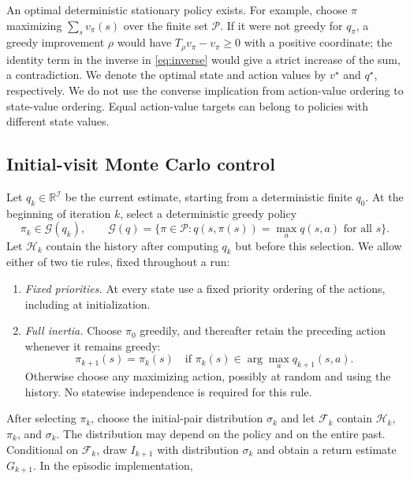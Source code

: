An optimal deterministic stationary policy exists. For example, choose $\pi$ maximizing
$\sum_s v_\pi(s)$ over the finite set $\mathcal P$. If it were not greedy for $q_\pi$, a greedy improvement $\rho$ would
have $T_\rho v_\pi-v_\pi\ge0$ with a positive coordinate; the identity term in the inverse in \eqref{eq:inverse} would
give a strict increase of the sum, a contradiction. We denote the optimal state and action
values by $v^\star$ and $q^\star$, respectively. We do not use the converse implication from action-value
ordering to state-value ordering. Equal action-value targets can belong to policies with
different state values.

\subsection{Initial-visit Monte Carlo control}\label{sec:algorithm}
Let $q_k\in\mathbb R^{\mathcal I}$ be the current estimate, starting from a deterministic finite $q_0$. At the beginning
of iteration $k$, select a deterministic greedy policy
\begin{equation}\label{eq:greedy}
\pi_k\in\mathcal G(q_k),\qquad
\mathcal G(q)=\{\pi\in\mathcal P:q(s,\pi(s))=\max_a q(s,a)\text{ for all }s\}.
\end{equation}
Let $\mathcal H_k$ contain the history after computing $q_k$ but before this selection. We allow either of
two tie rules, fixed throughout a run:
\begin{enumerate}
\item \emph{Fixed priorities.} At every state use a fixed priority ordering of the actions, including at
initialization.
\item \emph{Full inertia.} Choose $\pi_0$ greedily, and thereafter retain the preceding action whenever it
remains greedy:
\begin{equation}\label{eq:inertia}
\pi_{k+1}(s)=\pi_k(s)\quad\text{if }\pi_k(s)\in\arg\max_a q_{k+1}(s,a).
\end{equation}
Otherwise choose any maximizing action, possibly at random and using the history.
No statewise independence is required for this rule.
\end{enumerate}
After selecting $\pi_k$, choose the initial-pair distribution $\sigma_k$ and let $\mathcal F_k$ contain $\mathcal H_k$, $\pi_k$, and $\sigma_k$.
The distribution may depend on the policy and on the entire past. Conditional on $\mathcal F_k$, draw
$I_{k+1}$ with distribution $\sigma_k$ and obtain a return estimate $G_{k+1}$. In the episodic implementation,
